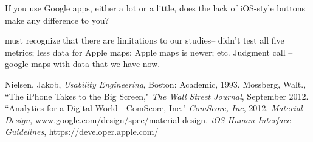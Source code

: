 \documentclass[a4paper; 11pt]{article}
\begin{document}
If you use Google apps, either a lot or a little, does the lack of iOS-style buttons make any difference to you?

must recognize that there are limitations to our studies-- didn't test all five metrics; less data for Apple maps; Apple maps is newer; etc.
Judgment call -- google maps with data that we have now.
\clearpage
\begin{thebibliography}{100} %
 Nielsen, Jakob, \emph{Usability Engineering}, Boston: Academic, 1993.
 Mossberg, Walt., ``The iPhone Takes to the Big Screen," \emph{The Wall Street Journal}, September 2012.
``Analytics for a Digital World - ComScore, Inc." \emph{ComScore, Inc}, 2012.
 \emph{Material Design}, www.google.com/design/spec/material-design.
 \emph{iOS Human Interface Guidelines}, https://developer.apple.com/
\end{thebibliography}
\end{document}
